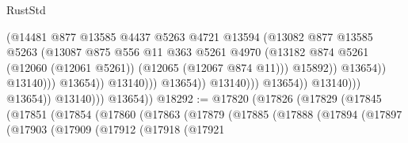 \begin{lexlean}{RustStd}
\begin{coremodule}
                                                        (@14481
                                                          @877
                                                          @13585
                                                          @4437
                                                          @5263
                                                          @4721
                                                          @13594
                                                          (@13082
                                                            @877
                                                            @13585
                                                            @5263
                                                            (@13087
                                                              @875
                                                              @556
                                                              @11
                                                              @363
                                                              @5261
                                                              @4970
                                                              (@13182
                                                                @874
                                                                @5261
                                                                (@12060 (@12061 @5261))
                                                                (@12065 (@12067 @874 @11)))
                                                              @15892))
                                                          @13654))
                                                      @13140)))
                                                @13654))
                                            @13140)))
                                      @13654))
                                  @13140)))
                            @13654))
                        @13140)))
                  @13654))
              @13140)))
        @13654))
@18292 := @17820
    (@17826
      (@17829
        (@17845
          (@17851
            (@17854
              (@17860
                (@17863
                  (@17879
                    (@17885
                      (@17888
                        (@17894
                          (@17897
                            (@17903
                              (@17909
                                (@17912
                                  (@17918
                                    (@17921

\end{coremodule}
\end{lexlean}
